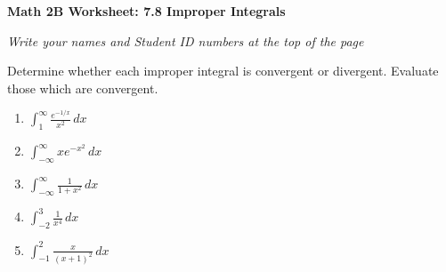 \documentclass[12pt,fleqn]{article}
\begin{document}
\begin{center}
	\textbf{Math 2B Worksheet: 7.8 Improper Integrals}
\end{center}

\emph{Write your names and Student ID numbers at the top of the page}

Determine whether each improper integral is convergent or divergent. Evaluate those which are convergent.
\begin{enumerate}
\item $\displaystyle \int_1^{\infty}\frac{e^{-1/x}}{x^2}\,dx$\vfill

\item $\displaystyle \int_{-\infty}^\infty xe^{-x^2}\,dx$\vfill

\item $\displaystyle \int_{-\infty}^\infty \frac{1}{1+x^2}\,dx$\vfill

\newpage

\item $\displaystyle \int_{-2}^3\frac{1}{x^4}\,dx$\vfill

\item $\displaystyle \int_{-1}^2\frac{x}{(x+1)^2}\,dx$\vfill


\end{enumerate}
\end{document}
